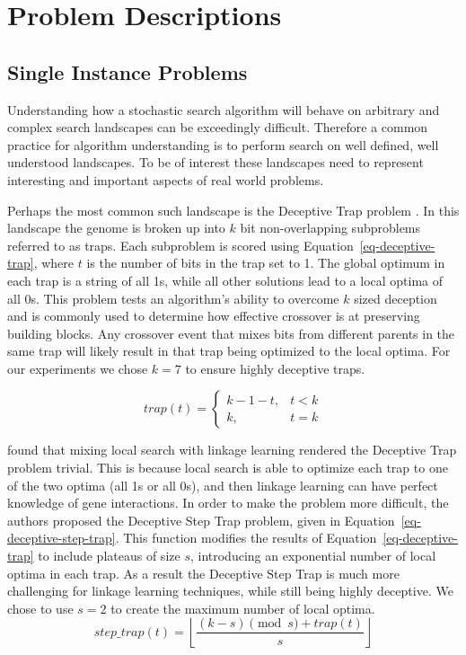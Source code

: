 \chapter{Problem Descriptions}
\label{chap-problems}

\section{Single Instance Problems}
Understanding how a stochastic search algorithm will behave on arbitrary and complex
search landscapes can be exceedingly difficult. Therefore a common practice for
algorithm understanding is to perform search on well defined, well understood
landscapes. To be of interest these landscapes need to represent interesting
and important aspects of real world problems.

Perhaps the most common such landscape is the Deceptive Trap problem \citep{goldberg:1991:gasize}.
In this landscape the genome is broken up into $k$ bit non-overlapping subproblems referred
to as traps.
Each subproblem is scored using Equation~\ref{eq-deceptive-trap}, where $t$ is the number of
bits in the trap set to 1. The global optimum in each trap is a string of all 1s, while all
other solutions lead to a local optima of all 0s. This problem tests an algorithm's
ability to overcome $k$ sized deception and is commonly used to determine how effective crossover
is at preserving building blocks. Any crossover event that mixes bits from different parents in
the same trap will likely result in that trap being optimized to the local optima. For our experiments
we chose $k=7$ to ensure highly deceptive traps.

\begin{equation}
   trap(t) = \left\{
     \begin{array}{rl}
       k-1-t, &  t<k\\
       k,   &  t = k
     \end{array}
   \right.
  \label{eq-deceptive-trap}
\end{equation}

\cite{goldman:2012:ltga} found that mixing local search with linkage learning rendered the Deceptive
Trap problem trivial. This is because local search is able to optimize each trap to one of the two
optima (all 1s or all 0s), and then linkage learning can have perfect knowledge of gene interactions.
In order to make the problem more difficult, the authors proposed the Deceptive
Step Trap problem, given in Equation~\ref{eq-deceptive-step-trap}. This function modifies the results
of Equation~\ref{eq-deceptive-trap} to include plateaus of size $s$, introducing an exponential number
of local optima in each trap. As a result the Deceptive Step Trap is much more challenging for linkage
learning techniques, while still being highly deceptive. We chose to use $s=2$ to create the maximum
number of local optima.
\begin{equation}
   step\_trap(t) = \left \lfloor \frac{(k-s)\pmod{s} + trap(t)}{s} \right \rfloor
  \label{eq-deceptive-step-trap}
\end{equation}

